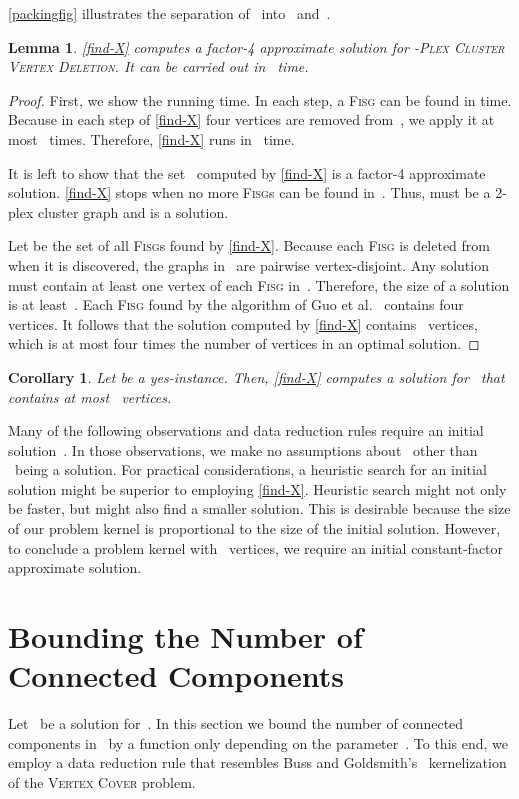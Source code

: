 \documentclass[12pt, a4paper, abstracton]{scrreprt}
\renewcommand{\cite}{~\citep}
\newcommand{\name}{\textsc}
\newcommand{\pvd}[1]{\name{\mbox{-Plex} Cluster Vertex Deletion}}
\newcommand{\FISG}{\textsc{Fisg}}
\newcounter{theorem}
\newtheorem{korollar}{Corollary}[chapter]
\newtheorem{lemma}{Lemma}[chapter]
\theoremstyle{definition}
\theoremstyle{remark}
\begin{document}
\noindent \autoref{packingfig} illustrates the separation of~
into~ and~.
\begin{lemma}\label{find-X-time}
  \autoref{find-X} computes a factor-4 approximate solution for \pvd 2. It can be carried out in ~time.
\end{lemma}
\begin{proof}
  First, we show the running time.
  In each step, a \FISG{} can be found in  time. Because in each step of \autoref{find-X} four vertices are removed from~, we apply it at most ~times. Therefore, \autoref{find-X} runs in ~time.

  It is left to show that the set~ computed by \autoref{find-X} is a factor-4 approximate solution.  \autoref{find-X} stops when no more \FISG{}s can be found in~. Thus,  must be a 2-plex cluster graph and  is a solution.

  Let  be the set of all \FISG{}s found by \autoref{find-X}. Because each \FISG{} is deleted from~ when it is discovered, the graphs in~ are pairwise vertex-disjoint. Any solution must contain at least one vertex of each \FISG{} in~. Therefore, the size of a solution is at least~. Each \FISG{} found by the algorithm of Guo et al.\cite{DBLP:conf/aaim/GuoKNU09} contains four vertices. It follows that the solution  computed by \autoref{find-X} contains~ vertices, which is at most four times the number of vertices in an optimal solution.
\end{proof}
\begin{korollar}\label{X-boundary}
  Let  be a yes-instance. Then, \autoref{find-X} computes a solution for~ that contains at most~ vertices.
\end{korollar}
\noindent Many of the following observations and data reduction rules require an initial solution~. In those observations, we make no assumptions about~ other than ~being a solution. For practical considerations, a heuristic search for an initial solution might be superior to employing \autoref{find-X}. Heuristic search might not only be faster, but might also find a smaller solution. This is desirable because the size of our problem kernel is proportional to the size of the initial solution. However, to conclude a problem kernel with~ vertices, we require an initial constant-factor approximate solution.

\section{Bounding the Number of Connected Components}
\label{mark}
Let~ be a solution for~. In this section we bound the number of connected components in~ by a function only depending on the parameter~. To this end, we employ a data reduction rule that resembles Buss and Goldsmith's\cite{BG93} kernelization of the \name{Vertex Cover} problem.
\end{document}
